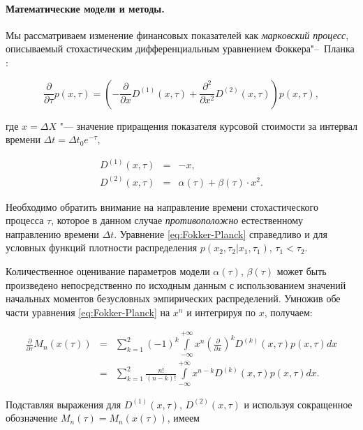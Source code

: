 \documentclass{mce-article}
\begin{document}
\paragraph{Математические модели и методы.}

Мы рассматриваем изменение финансовых показателей как \emph{марковский
  процесс}, описываемый стохастическим дифференциальным уравнением
Фоккера"--~Планка \cite{Risken:Fokker-Planck}:

\begin{equation}
  \label{eq:Fokker-Planck}
  \frac{\partial}{\partial \tau} p(x, \tau)
  = \left( - \frac{\partial}{\partial x} D^{(1)}(x, \tau)
    + \frac{\partial^2}{\partial x^2} D^{(2)}(x, \tau)
  \right) p(x, \tau),
\end{equation}

где $x = \Delta X$ "--- значение приращения показателя курсовой
стоимости за интервал времени $\Delta t = \Delta t_0 e^{-\tau}$,

\begin{eqnarray}
  D^{(1)}(x, \tau) &=& -x,\\
  D^{(2)}(x, \tau) &=& \alpha(\tau) + \beta(\tau) \cdot x^2.
\end{eqnarray}

Необходимо обратить внимание на направление времени стохастического
процесса $\tau$, которое в данном случае \emph{противоположно}
естественному направлению времени $\Delta t$.  Уравнение
\eqref{eq:Fokker-Planck} справедливо и для условных функций плотности
распределения $p(x_2, \tau_2| x_1, \tau_1),\, \tau_1 < \tau_2$.

Количественное оценивание параметров модели $\alpha(\tau)$,
$\beta(\tau)$ может быть произведено непосредственно по исходным
данным с использованием значений начальных моментов безусловных
эмпирических распределений. Умножив обе части уравнения
\eqref{eq:Fokker-Planck} на $x^n$ и интегрируя по $x$, получаем:

\begin{eqnarray}
  \label{eq:Kramer-Moyal}
  \frac{\partial}{\partial \tau} M_n(x(\tau))
  &=& \sum\limits_{k=1}^{2} \left( -1 \right)^k 
  \int\limits_{-\infty}^{+\infty}  x^n  \left( 
    \frac{\partial}{\partial x}  \right)^k  D^{(k)}(x,\tau)  
  p(x,\tau) dx \nonumber\\
  &=& \sum\limits_{k=1}^{2}  \frac{n!}{(n - k)!} 
  \int\limits_{-\infty}^{+\infty}  x^{n-k}  D^{(k)}(x,\tau)  
  p(x,\tau) dx.
\end{eqnarray}

Подставляя выражения для $D^{(1)}(x, \tau)$, $D^{(2)}(x, \tau)$ и
используя сокращенное обозначение $M_n(\tau) = M_n(x(\tau))$, имеем
\end{document}
